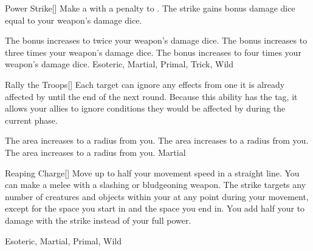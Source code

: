 \lowercase{\hypertarget{maneuver:Power Strike}{}}\label{maneuver:Power Strike}
\hypertarget{maneuver:Power Strike}{}
\begin{freeability}[Rank 2]{Power Strike}[]
Make a  with a  penalty to .
The strike gains bonus damage dice equal to your weapon's damage dice.

\rankline
{} The bonus increases to twice your weapon's damage dice.
 The bonus increases to three times your weapon's damage dice.
 The bonus increases to four times your weapon's damage dice.
 Esoteric, Martial, Primal, Trick, Wild
\end{freeability}
\vspace{0.25em}



\lowercase{\hypertarget{maneuver:Rally the Troops}{}}\label{maneuver:Rally the Troops}
\hypertarget{maneuver:Rally the Troops}{}
\begin{freeability}[Rank 2]{Rally the Troops}[]
Each target can ignore any effects from one  it is already affected by until the end of the next round.
Because this ability has the  tag, it allows your allies to ignore conditions they would be affected by during the current phase.

\rankline
{} The area increases to a \arealarge radius from you.
 The area increases to a \areahuge radius from you.
 The area increases to a \areaext radius from you.
 Martial
\end{freeability}
\vspace{0.25em}



\lowercase{\hypertarget{maneuver:Reaping Charge}{}}\label{maneuver:Reaping Charge}
\hypertarget{maneuver:Reaping Charge}{}
\begin{freeability}[Rank 2]{Reaping Charge}[]
Move up to half your movement speed in a straight line.
You can make a melee  with a slashing or bludgeoning weapon.
The strike targets any number of creatures and objects within your  at any point during your movement, except for the space you start in and the space you end in.
You add half your  to damage with the strike instead of your full power.


 Esoteric, Martial, Primal, Wild
\end{freeability}
\vspace{0.25em}



